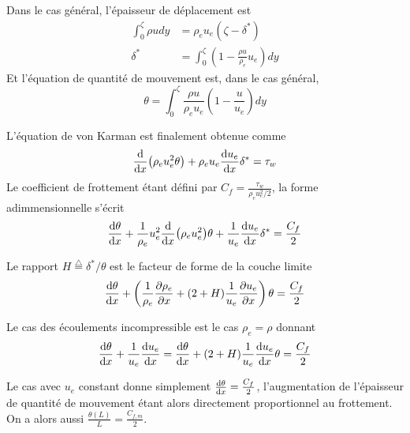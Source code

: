     Dans le cas général, l'épaisseur de déplacement est
    \begin{equation}
      \begin{aligned}
        \int_0^\zeta \rho u dy &= \rho_e u_e (\zeta - \delta^*)\\
        \delta^* &= \int_0^\zeta \left(1 - \frac{\rho u}{\rho_e}{u_e}\right)dy
      \end{aligned}
    \end{equation}
    Et l'équation de quantité de mouvement est, dans le cas général,
    \begin{equation}
      \theta = \int_0^\zeta \frac{\rho u}{\rho_e u_e} \left(1 - \frac{u}{u_e}\right) dy
    \end{equation}

    L'équation de von Karman est finalement obtenue comme
    \begin{equation}
      \dv{x}(\rho_e u_e^2 \theta) + \rho_e u_e \dv{u_e}{x} \delta^* = \tau_w
    \end{equation}
    Le coefficient de frottement étant défini par $C_f = \frac{\tau_w}{\rho_e u_e^2/2}$, la forme adimmensionnelle s'écrit
    \begin{equation}
      \dv{\theta}{x} + \frac{1}{\rho_e}{u_e^2} \dv{x}(\rho_e u_e^2) \theta + \frac{1}{u_e}\dv{u_e}{x} \delta^* = \frac{C_f}{2}
    \end{equation}

    Le rapport $H \overset{\triangle}{=} \delta^*/\theta$ est le facteur de forme de la couche limite
    \begin{equation}
      \dv{\theta}{x} + \left(\frac{1}{\rho_e}\pdv{\rho_e}{x} + (2+H) \frac{1}{u_e}\pdv{u_e}{x}\right)\theta = \frac{C_f}{2}
    \end{equation}

    Le cas des écoulements incompressible est le cas $\rho_e = \rho$ donnant
    \begin{equation}
      \dv{\theta}{x} + \frac{1}{u_e}\dv{u_e}{x}(2\theta + \delta^*) = \dv{\theta}{x} + (2+H) \frac{1}{u_e}\dv{u_e}{x} \theta = \frac{C_f}{2}
    \end{equation}

    Le cas avec $u_e$ constant donne simplement $\dv{\theta}{x} = \frac{C_f}{2}$, l'augmentation de l'épaisseur de quantité de mouvement étant alors directement proportionnel au frottement. On a alors aussi $\frac{\theta(L)}{L} = \frac{C_{f,m}}{2}$.

